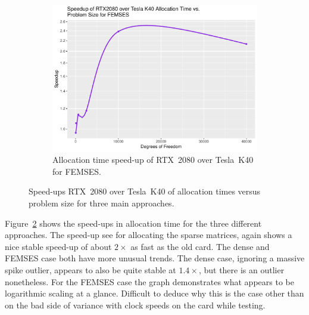 \begin{figure}
\begin{subfigure}{0.48\linewidth}
		\centering
		\includegraphics[width=\linewidth]{Plots/alloc_femses_rtx_speedup_vs_n}
		\caption{Allocation time speed-up of RTX~2080 over Tesla~K40 for FEMSES.}
		\label{fig:alloc_rtx_femses}
	\end{subfigure}
	\caption{Speed-ups RTX~2080 over Tesla~K40 of allocation times versus problem size for three main approaches.}
	\label{fig:alloc_rtx}
\end{figure}

Figure~\ref{fig:alloc_rtx} shows the speed-ups in allocation time for the three different approaches. The speed-up see for allocating the sparse matrices, again shows a nice stable speed-up of about $2\times$ as fast as the old card. The dense and FEMSES case both have more unusual trends. The dense case, ignoring a massive spike outlier, appears to also be quite stable at $1.4\times$, but there is an outlier nonetheless. For the FEMSES case the graph demonstrates what appears to be logarithmic scaling at a glance. Difficult to deduce why this is the case other than on the bad side of variance with clock speeds on the card while testing.

